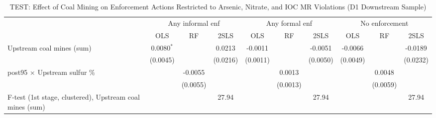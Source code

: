
\begin{table}[htbp]
   
   \caption{\label{tab:test_h3_inf_formal_chem} TEST: Effect of Coal Mining on Enforcement Actions Restricted to Arsenic, Nitrate, and IOC MR Violations (D1 Downstream Sample)}
   \bigskip
   
   \centering
   
   \begin{adjustbox}{width = \textwidth, center}
      
      
      \begin{tabular}{lccccccccc}
         \toprule
         
          & \multicolumn{3}{c}{Any informal enf} & \multicolumn{3}{c}{Any formal enf} & \multicolumn{3}{c}{No enforcement}\\
         
                                                                  & OLS           & RF            & 2SLS          & OLS           & RF            & 2SLS          & OLS           & RF            & 2SLS\\  
         
         \midrule 
         Upstream coal mines (sum)                                & 0.0080$^{*}$  &               & 0.0213        & -0.0011       &               & -0.0051       & -0.0066       &               & -0.0189\\   
                                                                  & (0.0045)      &               & (0.0216)      & (0.0011)      &               & (0.0050)      & (0.0049)      &               & (0.0232)\\   
         post95 $\times$ Upstream sulfur \%                       &               & -0.0055       &               &               & 0.0013        &               &               & 0.0048        &   \\   
                                                                  &               & (0.0055)      &               &               & (0.0013)      &               &               & (0.0059)      &   \\   
         
         F-test (1st stage, clustered), Upstream coal mines (sum) &               &               & 27.94         &               &               & 27.94         &               &               & 27.94\\  
         

\end{tabular}
\end{adjustbox}
\end{table}
